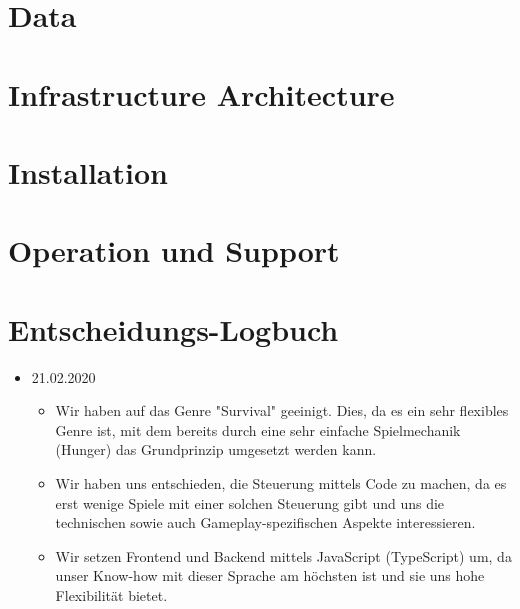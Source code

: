 \documentclass[a4paper, 11pt]{scrartcl}
\let\oldsection\section
\renewcommand\section{\clearpage\oldsection}
\begin{document}
\section{Data}

\section{Infrastructure Architecture}

\section{Installation}

\section{Operation und Support}

\section{Entscheidungs-Logbuch}

\begin{itemize}
\item 21.02.2020
\begin{itemize}
\item Wir haben auf das Genre "Survival" geeinigt. Dies, da es ein sehr flexibles Genre ist, mit dem bereits durch eine sehr einfache Spielmechanik (Hunger) das Grundprinzip umgesetzt werden kann.
\item Wir haben uns entschieden, die Steuerung mittels Code zu machen, da es erst wenige Spiele mit einer solchen Steuerung gibt und uns die technischen sowie auch Gameplay-spezifischen Aspekte interessieren.
\item Wir setzen Frontend und Backend mittels JavaScript (TypeScript) um, da unser Know-how mit dieser Sprache am höchsten ist und sie uns hohe Flexibilität bietet.
\end{itemize}
\end{itemize}

\clearpage

\printglossary[type=\acronymtype]

\printglossary
\end{document}
